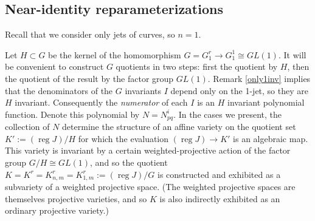\documentclass[12pt]{article}
\numberwithin{equation}{section}
\theoremstyle{plain}
\newtheorem{proposition}[definition]{Proposition}
\theoremstyle{definition}
\newcommand{\GL}{GL}
\newcommand{\ra}{\rightarrow}
\newcommand{\Fb}{\mathbb{F}}
\begin{document}

\subsection{Near-identity reparameterizations}

Recall that we consider only jets of curves, so $n=1$.

Let $H\subset G$ be the kernel of the homomorphism $G=G^{r}_{1}\ra G^{1}_{1}\cong \GL(1)$. It will be convenient to construct $G$ quotients in two steps: first the quotient by $H$, then the quotient of the result by the factor group $\GL(1)$. Remark \ref{only1inv} implies that the denominators of the $G$ invariants $I$ depend only on the 1-jet, so they are $H$ invariant. Consequently the \emph{numerator} of each $I$ is an $H$ invariant polynomial function. Denote this polynomial by $N=N_{pq}^{i}$. In the cases we present, the collection of $N$ determine the structure of an affine variety on the quotient set $K':=(\operatorname{reg}J)/H$ for which the evaluation $(\operatorname{reg}J)\ra K'$ is an algebraic map. This variety is invariant by a certain weighted-projective action of the factor group $G/H\cong \GL(1)$, and so the quotient $K=K^{r}=K^{r}_{n,m}=K^{r}_{1,m}:=(\operatorname{reg}J)/G$ is constructed and exhibited as a subvariety of a weighted projective space. (The weighted projective spaces are themselves projective varieties, and so $K$ is also indirectly exhibited as an ordinary projective variety.)
\end{document}
